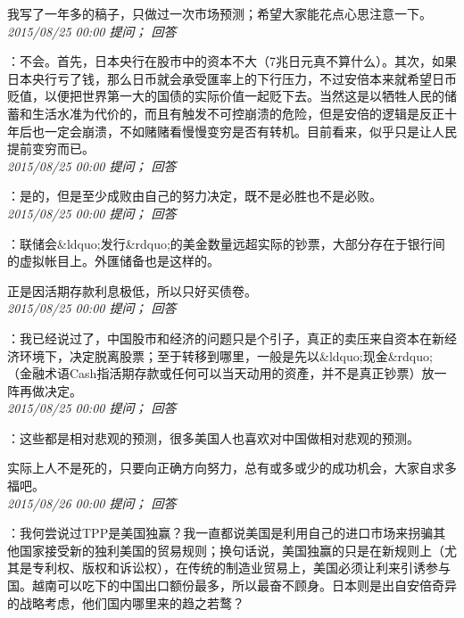 \documentclass[twocolumn]{ctexart}
\begin{document}
我写了一年多的稿子，只做过一次市场预测；希望大家能花点心思注意一下。\\

\textit{\hfill\noindent\small 2015/08/25 00:00 提问； 回答}

：不会。首先，日本央行在股市中的资本不大（7兆日元真不算什么）。其次，如果日本央行亏了钱，那么日币就会承受匯率上的下行压力，不过安倍本来就希望日币贬值，以便把世界第一大的国债的实际价值一起贬下去。当然这是以牺牲人民的储蓄和生活水准为代价的，而且有触发不可控崩溃的危险，但是安倍的逻辑是反正十年后也一定会崩溃，不如赌赌看慢慢变穷是否有转机。目前看来，似乎只是让人民提前变穷而已。\\

\textit{\hfill\noindent\small 2015/08/25 00:00 提问； 回答}

：是的，但是至少成败由自己的努力决定，既不是必胜也不是必败。\\

\textit{\hfill\noindent\small 2015/08/25 00:00 提问； 回答}

：联储会\&ldquo;发行\&rdquo;的美金数量远超实际的钞票，大部分存在于银行间的虚拟帐目上。外匯储备也是这样的。

正是因活期存款利息极低，所以只好买债卷。\\

\textit{\hfill\noindent\small 2015/08/25 00:00 提问； 回答}

：我已经说过了，中国股市和经济的问题只是个引子，真正的卖压来自资本在新经济环境下，决定脱离股票；至于转移到哪里，一般是先以\&ldquo;现金\&rdquo;（金融术语Cash指活期存款或任何可以当天动用的资產，并不是真正钞票）放一阵再做决定。\\

\textit{\hfill\noindent\small 2015/08/25 00:00 提问； 回答}

：这些都是相对悲观的预测，很多美国人也喜欢对中国做相对悲观的预测。

实际上人不是死的，只要向正确方向努力，总有或多或少的成功机会，大家自求多福吧。\\

\textit{\hfill\noindent\small 2015/08/26 00:00 提问； 回答}

：我何尝说过TPP是美国独赢？我一直都说美国是利用自己的进口市场来拐骗其他国家接受新的独利美国的贸易规则；换句话说，美国独赢的只是在新规则上（尤其是专利权、版权和诉讼权），在传统的制造业贸易上，美国必须让利来引诱参与国。越南可以吃下的中国出口额份最多，所以最奋不顾身。日本则是出自安倍奇异的战略考虑，他们国内哪里来的趋之若鹜？
\end{document}
